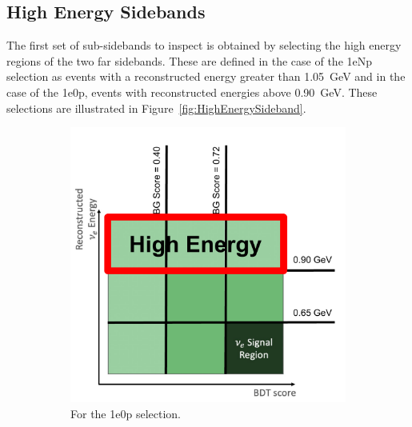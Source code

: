 \subsection{High Energy Sidebands}
\label{sec:HighEnergySidebands}

The first set of sub-sidebands to inspect is obtained by selecting the high energy regions of the two far sidebands. These are defined in the case of the 1eNp selection as events with a reconstructed energy greater than 1.05~GeV and in the case of the 1e0p, events with reconstructed energies above 0.90~GeV. These selections are illustrated in Figure~\ref{fig:HighEnergySideband}.

\begin{figure}[H]
    \centering
    \begin{subfigure}{0.5\linewidth}
        \includegraphics[width=\linewidth]{technote/Sidebands/Figures/FarSideband/ZpHighEnergySideband.pdf}
        \caption{For the 1e0p selection.}
    \end{subfigure}%
    \begin{subfigure}{0.5\linewidth}

\end{subfigure}
\end{figure}
